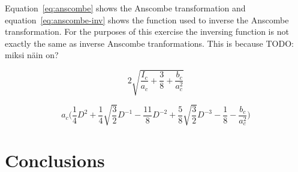 \documentclass[12pt,a4paper,english
]{tunithesis}
\begin{document}
Equation~\ref{eq:anscombe} shows the Anscombe transformation and equation~\ref{eq:anscombe-inv} shows the function used to inverse the Anscombe transformation. For the purposes of this exercise the inversing function is not exactly the same as inverse Anscombe tranformations. This is because TODO: miksi näin on?

\begin{equation}
\label{eq:anscombe}
  2 \sqrt{\frac{I_{c}}{a_{c}} + \frac{3}{8} + \frac{b_{c}}{a_{c}^2}}
\end{equation}

\begin{equation}
\label{eq:anscombe-inv}
  a_{c} \Bigg( \frac{1}{4}D^2 + \frac{1}{4}\sqrt{\frac{3}{2}}D^{-1} - \frac{11}{8}D^{-2} + \frac{5}{8} \sqrt{\frac{3}{2}}D^{-3} - \frac{1}{8} - \frac{b_{c}}{a_{c}^2} \Bigg)
  \end{equation}

\chapter{Conclusions}
\label{ch:conclusions}
%
%
\newpage

\printbibliography[title=References]
\end{document}
